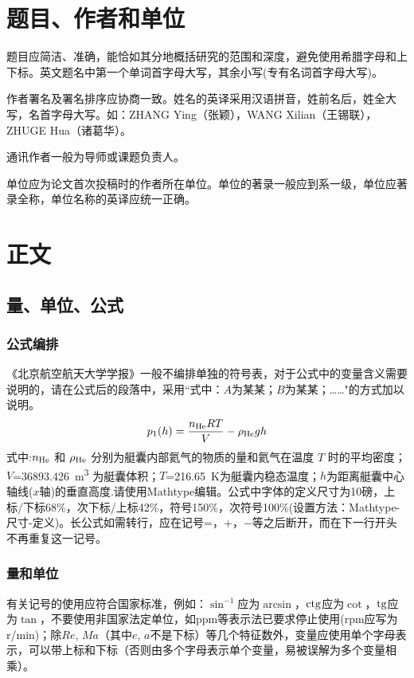 \documentclass[10.5pt,twocolumn]{jthu-st}
\begin{document}
\section{题目、作者和单位}
题目应简洁、准确，能恰如其分地概括研究的范围和深度，避免使用希腊字母和上下标。英文题名中第一个单词首字母大写，其余小写(专有名词首字母大写)。

作者署名及署名排序应协商一致。姓名的英译采用汉语拼音，姓前名后，姓全大写，名首字母大写。如：ZHANG Ying（张颖），WANG Xilian（王锡联），ZHUGE Hua（诸葛华）。

通讯作者一般为导师或课题负责人。

单位应为论文首次投稿时的作者所在单位。单位的著录一般应到系一级，单位应著录全称，单位名称的英译应统一正确。

\section{正文}
\subsection{量、单位、公式}
\subsubsection{公式编排}
\label{labSecForm}
《北京航空航天大学学报》一般不编排单独的符号表，对于公式中的变量含义需要说明的，请在公式后的段落中，采用``式中：$A$为某某；$B$为某某；……"的方式加以说明。
\begin{equation}
\label{eqnLabelp}
p_1 (h) = \dfrac{n_{\textnormal{He}}RT}{V}-\rho_{\textnormal{He}}gh
\end{equation}
式中:$n_{\textnormal{He}}$ 和 $\rho_{\textnormal{He}}$ 分别为艇囊内部氦气的物质的量和氦气在温度 $T$ 时的平均密度；
$V$=\SI{36893.426}{\cubic\meter}%
为艇囊体积；$T$=\SI{216.65}{\kelvin}为艇囊内稳态温度；$h$为距离艇囊中心轴线($x$轴)的垂直高度.请使用Mathtype编辑。公式中字体的定义尺寸为10磅，上标/下标68\%，次下标/上标42\%，符号150\%，次符号100\%(设置方法：Mathtype-尺寸-定义)。长公式如需转行，应在记号=，+，$-$等之后断开，而在下一行开头不再重复这一记号。

\subsubsection{量和单位}
有关记号的使用应符合国家标准，例如：$\sin^{-1}$应为$\arcsin$，$\rm ctg$应为$\cot$，$\rm tg$应为$\tan$，不要使用非国家法定单位，如ppm等表示法已要求停止使用(rpm应写为r/min)；除$Re$, $Ma$（其中$e$, $a$不是下标）等几个特征数外，变量应使用单个字母表示，可以带上标和下标（否则由多个字母表示单个变量，易被误解为多个变量相乘）。
\end{document}
